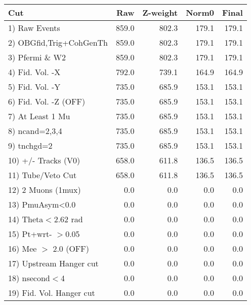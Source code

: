  \begin{table}[h!]\centering
 \begin{tabular}{||l||r|r|r|r||}
 \hline
 \hline
 Cut & Raw & Z-weight & Norm0 & Final \\
 \hline
  1) Raw Events           &       859.0 &       802.3 &       179.1 &       179.1 \\
  2) OBGfid,Trig+CohGenTh &       859.0 &       802.3 &       179.1 &       179.1 \\
  3) Pfermi \& W2         &       859.0 &       802.3 &       179.1 &       179.1 \\
  4) Fid. Vol. -X         &       792.0 &       739.1 &       164.9 &       164.9 \\
  5) Fid. Vol. -Y         &       735.0 &       685.9 &       153.1 &       153.1 \\
  6) Fid. Vol. -Z (OFF)   &       735.0 &       685.9 &       153.1 &       153.1 \\
  7) At Least 1 Mu        &       735.0 &       685.9 &       153.1 &       153.1 \\
  8) ncand=2,3,4          &       735.0 &       685.9 &       153.1 &       153.1 \\
  9) tnchgd=2             &       735.0 &       685.9 &       153.1 &       153.1 \\
 10) +/- Tracks (V0)      &       658.0 &       611.8 &       136.5 &       136.5 \\
 11) Tube/Veto Cut        &       658.0 &       611.8 &       136.5 &       136.5 \\
 12) 2 Muons (1mux)       &         0.0 &         0.0 &         0.0 &         0.0 \\
 13) PmuAsym<0.0          &         0.0 &         0.0 &         0.0 &         0.0 \\
 14) Theta$<$2.62 rad     &         0.0 &         0.0 &         0.0 &         0.0 \\
 15) Pt+wrt- $>$0.05      &         0.0 &         0.0 &         0.0 &         0.0 \\
 16) Mee $>$ 2.0  (OFF)   &         0.0 &         0.0 &         0.0 &         0.0 \\
 17) Upstream Hanger cut  &         0.0 &         0.0 &         0.0 &         0.0 \\
 18) nsecond$<$4          &         0.0 &         0.0 &         0.0 &         0.0 \\
 19) Fid. Vol. Hanger cut &         0.0 &         0.0 &         0.0 &         0.0 \\

\end{tabular}
\end{table}
